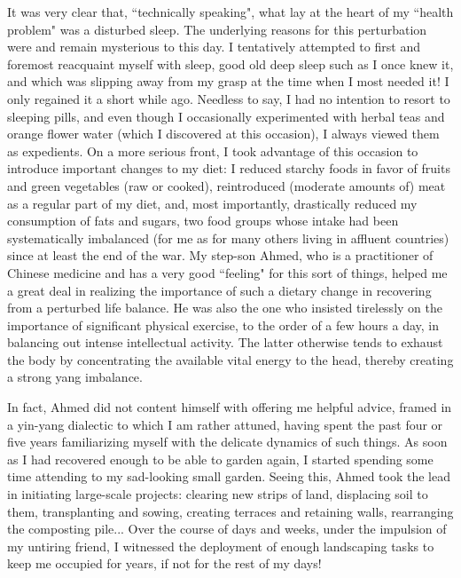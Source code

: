 It was very clear that, ``technically speaking", what lay at the heart of my ``health problem" was a disturbed sleep. The underlying reasons for this perturbation were and remain mysterious to this day. I tentatively attempted to first and foremost reacquaint myself with sleep, good old deep sleep such as I once knew it, and which was slipping away from my grasp at the time when I most needed it! I only regained it a short while ago. Needless to say, I had no intention to resort to sleeping pills, and even though I occasionally experimented with herbal teas and orange flower water (which I discovered at this occasion), I always viewed them as expedients. On a more serious front, I took advantage of this occasion to introduce important changes to my diet: I reduced starchy foods in favor of fruits and green vegetables (raw or cooked), reintroduced (moderate amounts of) meat as a regular part of my diet, and, most importantly, drastically reduced my consumption of fats and sugars, two food groups whose intake had been systematically imbalanced (for me as for many others living in affluent countries) since at least the end of the war. My step-son Ahmed, who is a practitioner of Chinese medicine and has a very good ``feeling" for this sort of things, helped me a great deal in realizing the importance of such a dietary change in recovering from a perturbed life balance. He was also the one who insisted tirelessly on the importance of significant physical exercise, to the order of a few hours a day, in balancing out intense intellectual activity. The latter otherwise tends to exhaust the body by concentrating the available vital energy to the head, thereby creating a strong yang imbalance.

In fact, Ahmed did not content himself with offering me helpful advice, framed in a yin-yang dialectic to which I am rather attuned, having spent the past four or five years familiarizing myself with the delicate dynamics of such things. As soon as I had recovered enough to be able to garden again, I started spending some time attending to my sad-looking small garden. Seeing this, Ahmed took the lead in initiating large-scale projects: clearing new strips of land, displacing soil to them, transplanting and sowing, creating terraces and retaining walls, rearranging the composting pile... Over the course of days and weeks, under the impulsion of my untiring friend, I witnessed the deployment of enough landscaping tasks to keep me occupied for years, if not for the rest of my days!

